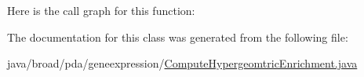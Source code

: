 Here is the call graph for this function\+:




The documentation for this class was generated from the following file\+:\begin{DoxyCompactItemize}
\item 
java/broad/pda/geneexpression/\hyperlink{_compute_hypergeomtric_enrichment_8java}{Compute\+Hypergeomtric\+Enrichment.\+java}\end{DoxyCompactItemize}
